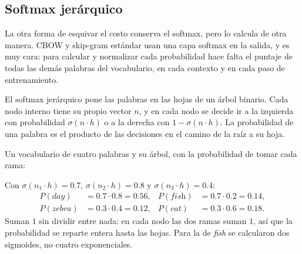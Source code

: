 \documentclass[11pt,letterpaper]{article}
\begin{document}
\subsection*{Softmax jerárquico}

La otra forma de esquivar el costo conserva el softmax, pero lo
calcula de otra manera. CBOW y skip-gram estándar usan una capa
softmax en la salida, y es muy cara: para calcular y normalizar cada
probabilidad hace falta el puntaje de todas las demás palabras del
vocabulario, en cada contexto y en cada paso de entrenamiento.

El softmax jerárquico pone las palabras en las hojas de un árbol
binario. Cada nodo interno tiene su propio vector $n$, y en cada nodo
se decide ir a la izquierda con probabilidad $\sigma(n \cdot h)$ o a
la derecha con $1 - \sigma(n \cdot h)$. La probabilidad de una palabra
es el producto de las decisiones en el camino de la raíz a su hoja.

\begin{ejemplo}
    Un vocabulario de cuatro palabras y su árbol, con la probabilidad
    de tomar cada rama:
    \begin{center}
    \end{center}
    Con $\sigma(n_1 \cdot h) = 0.7$, $\sigma(n_2 \cdot h) = 0.8$ y
    $\sigma(n_3 \cdot h) = 0.4$:
    \begin{align*}
        P(\textit{day})   &= 0.7 \cdot 0.8 = 0.56 , &
        P(\textit{fish})  &= 0.7 \cdot 0.2 = 0.14 , \\
        P(\textit{zebra}) &= 0.3 \cdot 0.4 = 0.12 , &
        P(\textit{cat})   &= 0.3 \cdot 0.6 = 0.18 .
    \end{align*}
    Suman $1$ sin dividir entre nada: en cada nodo las dos ramas suman
    $1$, así que la probabilidad se reparte entera hasta las hojas.
    Para la de \textit{fish} se calcularon dos sigmoides, no cuatro
    exponenciales.
\end{ejemplo}
\end{document}
